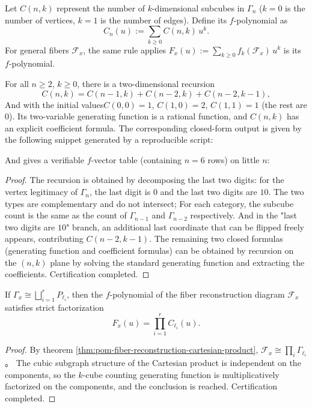 \begin{definition}\label{def:pom-fibcube-fvector}
Let \(C(n,k)\) represent the number of \(k\)-dimensional subcubes in \(\Gamma_n\) (\(k=0\) is the number of vertices, \(k=1\) is the number of edges).
Define its \(f\)-polynomial as
\[
C_n(u):=\sum_{k\ge 0} C(n,k)\,u^k.
\]
For general fibers \(\mathcal F_x\), the same rule applies
\(
F_x(u):=\sum_{k\ge 0} f_k(\mathcal F_x)\,u^k
\)
is its \(f\)-polynomial.
\end{definition}

\begin{theorem}\label{thm:pom-fibcube-fvector-closed}
For all \(n\ge 2\), \(k\ge 0\), there is a two-dimensional recursion
\[
C(n,k)=C(n-1,k)+C(n-2,k)+C(n-2,k-1),
\]
And with the initial values ​​\(C(0,0)=1\), \(C(1,0)=2\), \(C(1,1)=1\) (the rest are \(0\)).
Its two-variable generating function is a rational function, and \(C(n,k)\) has an explicit coefficient formula.
The corresponding closed-form output is given by the following snippet generated by a reproducible script:


And gives a verifiable \(f\)-vector table (containing \(n=6\) rows) on little \(n\):

\end{theorem}

\begin{proof}
The recursion is obtained by decomposing the last two digits: for the vertex legitimacy of \(\Gamma_n\), the last digit is \(0\) and the last two digits are \(10\). The two types are complementary and do not intersect;
For each category, the subcube count is the same as the count of \(\Gamma_{n-1}\) and \(\Gamma_{n-2}\) respectively.
And in the "last two digits are \(10\)" branch, an additional last coordinate that can be flipped freely appears, contributing \(C(n-2,k-1)\).
The remaining two closed formulas (generating function and coefficient formulas) can be obtained by recursion on the \((n,k)\) plane by solving the standard generating function and extracting the coefficients.
Certification completed.
\end{proof}

\begin{corollary}\label{cor:pom-fiber-fpoly-factorization}
If \(\Gamma_x\cong\bigsqcup_{i=1}^r P_{\ell_i}\), then the \(f\)-polynomial of the fiber reconstruction diagram \(\mathcal F_x\) satisfies strict factorization
\[
F_x(u)=\prod_{i=1}^r C_{\ell_i}(u).
\]
\end{corollary}
\begin{proof}
By theorem \ref{thm:pom-fiber-reconstruction-cartesian-product},
\(
\mathcal F_x\cong \prod_i \Gamma_{\ell_i}
\)。
The cubic subgraph structure of the Cartesian product is independent on the components, so the \(k\)-cube counting generating function is multiplicatively factorized on the components, and the conclusion is reached. Certification completed.
\end{proof}

